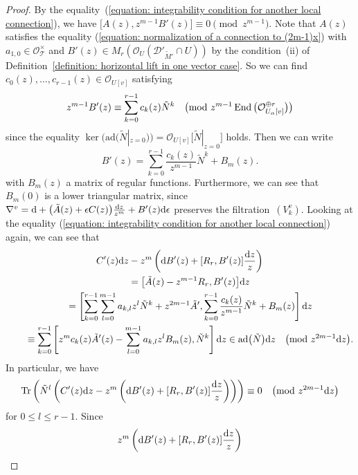 \documentclass[pdftex]{sigma}
\numberwithin{equation}{section}
\newcommand{\Tr}{\mathop{\rm Tr}\nolimits}
\newcommand\End{\mathop{\rm End}\nolimits}
\begin{document}
\begin{proof}
By the equality~(\ref{equation: integrability condition for another local connection}),
 we have $\big[A(z),z^{m-1} B'(z)\big]\equiv 0 \pmod{z^{m-1}}$.
Note that $A(z)$ satisfies the equality
(\ref{equation: normalization of a connection to (2m-1)x})
with $a_{1,0}\in{\mathcal O}_{\mathcal T}^{\times}$ and
$B'(z) \in M_r({\mathcal O}_U ({\mathcal D}'_{\tilde{M}'}\cap U))$
by the condition~(ii) of Definition~\ref{definition: horizontal lift in one vector case}.
So we can find $c_0(z),\dots,c_{r-1}(z)\in {\mathcal O}_{U[v]}$
satisfying
\[
 z^{m-1}B'(z)\equiv \sum_{k=0}^{r-1} c_k(z) \tilde{N}^k \quad
 \big({\rm mod} \ z^{m-1}\End\big({\mathcal O}_{U_{\alpha}[v]}^{\oplus r}\big) \big)
\]
since the equality
$\ker \big(\mathrm{ad}\big( \tilde{N}|_{z=0}\big) \big)
={\mathcal O}_{U[v]}\big[\tilde{N}|_{z=0}\big]$
holds.
Then we can write
\[
 B'(z)=\sum_{k=0}^{r-1} \frac {c_k(z)} {z^{m-1}} \tilde{N}^k +B_m (z).
\]
with $B_m (z)$ a matrix of regular functions.
Furthermore,
we can see that
$B_m (0)$ is a lower triangular matrix, since
$\nabla^v={\rm d}+\big(\tilde{A}(z)+\epsilon C(z)\big)\frac{{\rm d}z}{z^m}+B'(z){\rm d}\epsilon$
preserves the filtration~$(V^v_k)$.
Looking at the equality (\ref{equation: integrability condition for another local connection})
again, we can see that
\begin{gather*}
 C'(z){\rm d}z-z^m\left( {\rm d}B'(z)+[R_r,B'(z)]\frac{{\rm d}z}{z} \right)
 \\
\qquad{}=
 \big[\tilde{A}(z)-z^{m-1}R_r,B'(z)\big]{\rm d}z
 \\
\qquad{} =\left[ \sum_{k=0}^{r-1}\sum_{l=0}^{m-1}a_{k,l}z^l\tilde{N}^k+z^{2m-1}\tilde{A}' ,
 \sum_{k=0}^{r-1} \frac{c_k(z)}{z^{m-1}} \tilde{N}^k+B_m(z) \right]{\rm d}z
 \\
\qquad{} \equiv
 \sum_{k=0}^{r-1}
 \left[ z^m c_k(z)\tilde{A}'(z)
 -\sum_{l=0}^{m-1}a_{k,l}z^l B_m(z) , \tilde{N}^k \right]{\rm d}z
 \in\mathrm{ad}\big(\tilde{N}\big){\rm d}z\quad \big({\rm mod} \ z^{2m-1}{\rm d}z\big).
\end{gather*}
In particular, we have
\begin{equation}\label{equation: trace condition for extending generalized isomonodromy}
\Tr \left( \tilde{N}^l \left( C'(z){\rm d}z-z^m\left( {\rm d}B'(z)+[R_r,B'(z)]\frac{{\rm d}z}{z} \right)
\right)\right)\equiv 0 \quad \big({\rm mod} \ z^{2m-1}{\rm d}z\big)
\end{equation}
for $0\leq l\leq r-1$.
Since
\begin{gather*}
 z^m \left( {\rm d}B'(z) +[R_r,B'(z)]\frac{{\rm d}z}{z} \right)
\\

\end{gather*}
\end{proof}
\end{document}
